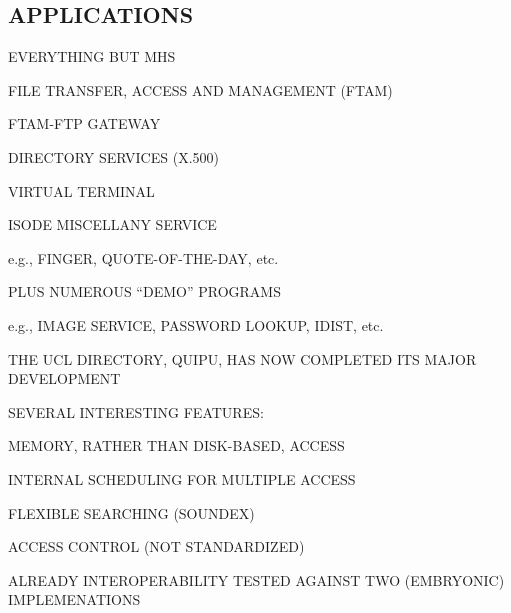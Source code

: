 \begin{bwslide}
\part*	{APPLICATIONS}\bf

\begin{nrtc}
\item	EVERYTHING BUT MHS
\end{nrtc}
\end{bwslide}


\begin{bwslide}

\begin{nrtc}
\item	FILE TRANSFER, ACCESS AND MANAGEMENT (FTAM)

\item	FTAM-FTP GATEWAY

\item	DIRECTORY SERVICES (X.500)

\item	VIRTUAL TERMINAL

\item	ISODE MISCELLANY SERVICE
    \begin{nrtc}
    \item	e.g., FINGER, QUOTE-OF-THE-DAY, etc.
    \end{nrtc}

\item	PLUS NUMEROUS ``DEMO'' PROGRAMS
    \begin{nrtc}
    \item	e.g., IMAGE SERVICE, PASSWORD LOOKUP, IDIST, etc.
    \end{nrtc}
\end{nrtc}
\end{bwslide}


\begin{bwslide}

\begin{nrtc}
\item	THE UCL DIRECTORY, QUIPU, HAS NOW COMPLETED ITS MAJOR DEVELOPMENT

\item	SEVERAL INTERESTING FEATURES:
    \begin{nrtc}
    \item	MEMORY, RATHER THAN DISK-BASED, ACCESS

    \item	INTERNAL SCHEDULING FOR MULTIPLE ACCESS

    \item	FLEXIBLE SEARCHING (SOUNDEX)

    \item	ACCESS CONTROL (NOT STANDARDIZED)
    \end{nrtc}

\item	ALREADY INTEROPERABILITY TESTED AGAINST TWO (EMBRYONIC) IMPLEMENATIONS
\end{nrtc}
\end{bwslide}


